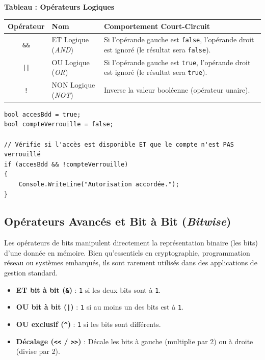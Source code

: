 \begin{center}
    \textbf{Tableau : Opérateurs Logiques} \\[0.3cm]
    \begin{tabular}{@{}clp{9cm}@{}}
        \toprule
        \textbf{Opérateur} & \textbf{Nom} & \textbf{Comportement Court-Circuit} \\
        \midrule
        \texttt{\&\&} & ET Logique (\emph{AND}) & Si l'opérande gauche est \texttt{false}, l'opérande droit est ignoré (le résultat sera \texttt{false}). \\
        \texttt{||} & OU Logique (\emph{OR}) & Si l'opérande gauche est \texttt{true}, l'opérande droit est ignoré (le résultat sera \texttt{true}). \\
        \texttt{!} & NON Logique (\emph{NOT}) & Inverse la valeur booléenne (opérateur unaire). \\
        \bottomrule
    \end{tabular}
\end{center}

\begin{lstlisting}[caption={Évaluation logique conditionnelle}]
bool accesBdd = true;
bool compteVerrouille = false;

// Vérifie si l'accès est disponible ET que le compte n'est PAS verrouillé
if (accesBdd && !compteVerrouille)
{
    Console.WriteLine("Autorisation accordée.");
}
\end{lstlisting}

\subsection{Opérateurs Avancés et Bit à Bit (\emph{Bitwise})}

Les opérateurs de bits manipulent directement la représentation binaire (les bits) d'une donnée en mémoire. Bien qu'essentiels en cryptographie, programmation réseau ou systèmes embarqués, ils sont rarement utilisés dans des applications de gestion standard.

\begin{itemize}
    \item \textbf{ET bit à bit (\texttt{\&})} : \texttt{1} si les deux bits sont à \texttt{1}.
    \item \textbf{OU bit à bit (\texttt{|})} : \texttt{1} si au moins un des bits est à \texttt{1}.
    \item \textbf{OU exclusif (\texttt{\textasciicircum})} : \texttt{1} si les bits sont différents.
    \item \textbf{Décalage (\texttt{<<} / \texttt{>>})} : Décale les bits à gauche (multiplie par 2) ou à droite (divise par 2).
\end{itemize}

